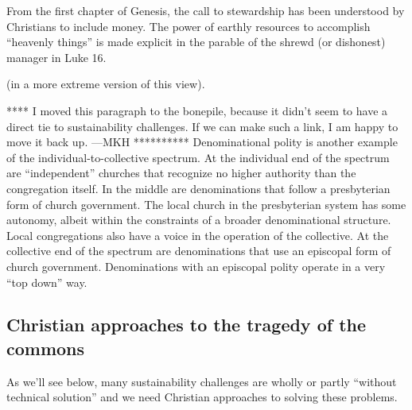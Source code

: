\documentclass[12pt]{article}
\begin{document}
From the first chapter of Genesis, the call to stewardship has
been understood by Christians to include money. 
The power of earthly resources to accomplish ``heavenly things'' is made
explicit in the parable of the shrewd (or dishonest) manager in Luke 16. 

 (in a more extreme version of this view).



**** I moved this paragraph to the bonepile, because it didn't seem to have a direct tie
to sustainability challenges. 
If we can make such a link, I am happy to move it back up.
---MKH **********
 Denominational polity is another example of the individual-to-collective spectrum.
At the individual end of the spectrum are ``independent'' churches 
that recognize no higher authority than the congregation itself.
In the middle are denominations that follow a presbyterian form of church government. 
The local church in the presbyterian system has some autonomy, 
albeit within the constraints of a broader denominational structure. 
Local congregations also have a voice in the operation of the collective. 
At the collective end of the spectrum are denominations that use 
an episcopal form of church government. 
Denominations with an episcopal polity operate in a very ``top down'' way.


\subsection{Christian approaches to the tragedy of the commons}
\label{sec:totc}


As we'll see below, many sustainability challenges are wholly or partly ``without technical solution'' and we need
Christian approaches to solving these problems.






\printbibliography
\end{document}
